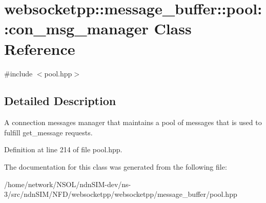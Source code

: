 \hypertarget{classwebsocketpp_1_1message__buffer_1_1pool_1_1con__msg__manager}{}\section{websocketpp\+:\+:message\+\_\+buffer\+:\+:pool\+:\+:con\+\_\+msg\+\_\+manager Class Reference}
\label{classwebsocketpp_1_1message__buffer_1_1pool_1_1con__msg__manager}


{\ttfamily \#include $<$pool.\+hpp$>$}



\subsection{Detailed Description}
A connection messages manager that maintains a pool of messages that is used to fulfill get\+\_\+message requests. 

Definition at line 214 of file pool.\+hpp.



The documentation for this class was generated from the following file\+:\begin{DoxyCompactItemize}
\item 
/home/network/\+N\+S\+O\+L/ndn\+S\+I\+M-\/dev/ns-\/3/src/ndn\+S\+I\+M/\+N\+F\+D/websocketpp/websocketpp/message\+\_\+buffer/pool.\+hpp\end{DoxyCompactItemize}
